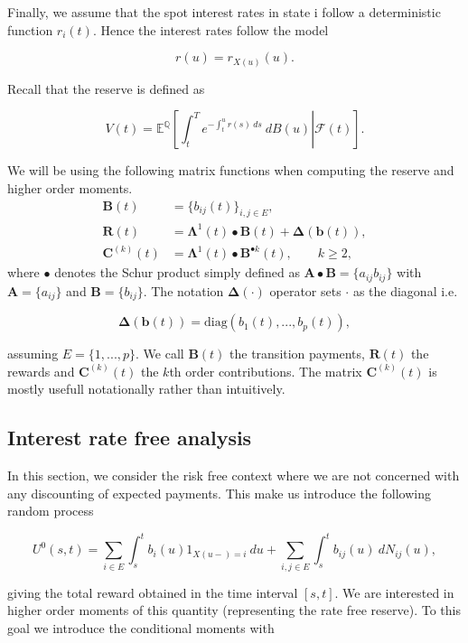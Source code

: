 \documentclass[
]{book}
\begin{document}
Finally, we assume that the spot interest rates in state i follow a deterministic function \(r_i(t)\). Hence the interest rates follow the model

\[
r(u) = r_{X(u)}(u).
\]

Recall that the reserve is defined as

\[
V(t)=\mathbb E^{\mathbb Q}\left[\left.\int_t^Te^{-\int_t^ur(s)\ ds}\ dB(u)\right\vert \mathcal F(t)\right].
\]

We will be using the following matrix functions when computing the reserve and higher order moments.
\begin{align*}
\mathbf B(t)&=\{b_{ij}(t)\}_{i,j\in E},\\
\mathbf R(t)&=\mathbf \Lambda^1(t)\bullet \mathbf B(t) + \mathbf \Delta (\mathbf b(t)),\\
\mathbf C^{(k)}(t)&=\mathbf \Lambda^1(t)\bullet \mathbf B^{\bullet k}(t),\qquad k\ge 2,
\end{align*}
where \(\bullet\) denotes the Schur product simply defined as \(\mathbf A\bullet\mathbf B=\{a_{ij}b_{ij}\}\) with \(\mathbf A=\{a_{ij}\}\) and \(\mathbf B=\{b_{ij}\}\). The notation \(\mathbf \Delta (\cdot)\) operator sets \(\cdot\) as the diagonal i.e.

\[
\mathbf \Delta (\mathbf b(t))=\text{diag}(b_1(t),...,b_p(t)),
\]

assuming \(E=\{1,...,p\}\). We call \(\mathbf B(t)\) the transition payments, \(\mathbf R(t)\) the rewards and \(\mathbf C^{(k)}(t)\) the \(k\)th order contributions. The matrix \(\mathbf C^{(k)}(t)\) is mostly usefull notationally rather than intuitively.

\hypertarget{interest-rate-free-analysis}{%
\subsection{Interest rate free analysis}\label{interest-rate-free-analysis}}

In this section, we consider the risk free context where we are not concerned with any discounting of expected payments. This make us introduce the following random process

\[
U^0(s,t) = \sum_{i\in E}\int_s^tb_i(u)1_{X(u-)=i}\ du+\sum_{i,j\in E}\int_s^tb_{ij}(u)\ dN_{ij}(u),
\]

giving the total reward obtained in the time interval \([s,t]\). We are interested in higher order moments of this quantity (representing the rate free reserve). To this goal we introduce the conditional moments with
\end{document}
